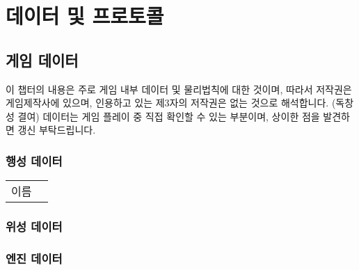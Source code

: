 \part{데이터 및 프로토콜}
\chapter{게임 데이터}
이 챕터의 내용은 주로 게임 내부 데이터 및 물리법칙에 대한 것이며, 따라서 저작권은 게임제작사에 있으며, 인용하고 있는 제3자의 저작권은 없는 것으로 해석합니다. (독창성 결여)
데이터는 게임 플레이 중 직접 확인할 수 있는 부분이며, 상이한 점을 발견하면 갱신 부탁드립니다.

\section{행성 데이터}
\begin{tabular}{|l|l|}
\hline
이름&
\end{tabular}
\section{위성 데이터}
\section{엔진 데이터}

\chapter{}